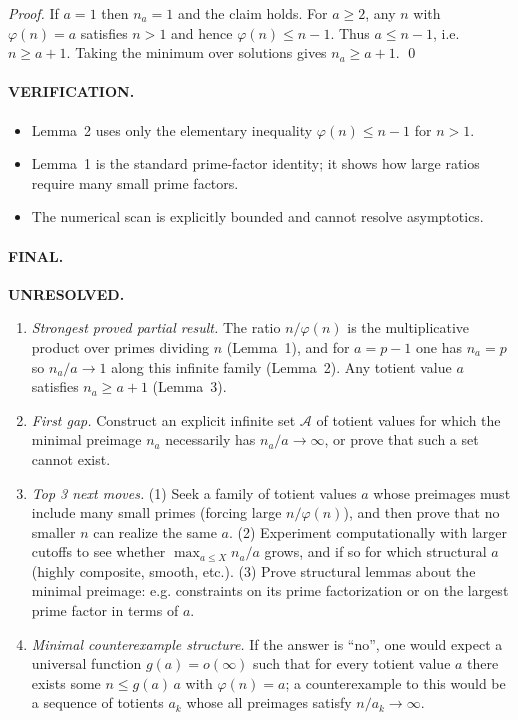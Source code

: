 \emph{Proof.}
If $a=1$ then $n_a=1$ and the claim holds.
For $a\ge 2$, any $n$ with $\varphi(n)=a$ satisfies $n>1$ and hence $\varphi(n)\le n-1$.
Thus $a\le n-1$, i.e. $n\ge a+1$.
Taking the minimum over solutions gives $n_a\ge a+1$. \qed

\paragraph{VERIFICATION.}
\begin{itemize}
\item Lemma~2 uses only the elementary inequality $\varphi(n)\le n-1$ for $n>1$.
\item Lemma~1 is the standard prime-factor identity; it shows how large ratios require many small prime factors.
\item The numerical scan is explicitly bounded and cannot resolve asymptotics.
\end{itemize}

\paragraph{FINAL.} \textbf{UNRESOLVED.}
\begin{enumerate}
\item[(i)] \emph{Strongest proved partial result.} The ratio $n/\varphi(n)$ is the multiplicative product over primes dividing $n$ (Lemma~1), and for $a=p-1$ one has $n_a=p$ so $n_a/a\to 1$ along this infinite family (Lemma~2). Any totient value $a$ satisfies $n_a\ge a+1$ (Lemma~3).
\item[(ii)] \emph{First gap.} Construct an explicit infinite set $\mathcal{A}$ of totient values for which the minimal preimage $n_a$ necessarily has $n_a/a\to\infty$, or prove that such a set cannot exist.
\item[(iii)] \emph{Top 3 next moves.}
(1) Seek a family of totient values $a$ whose preimages must include many small primes (forcing large $n/\varphi(n)$), and then prove that no smaller $n$ can realize the same $a$.
(2) Experiment computationally with larger cutoffs to see whether $\max_{a\le X} n_a/a$ grows, and if so for which structural $a$ (highly composite, smooth, etc.).
(3) Prove structural lemmas about the minimal preimage: e.g. constraints on its prime factorization or on the largest prime factor in terms of $a$.
\item[(iv)] \emph{Minimal counterexample structure.} If the answer is ``no'', one would expect a universal function $g(a)=o(\infty)$ such that for every totient value $a$ there exists some $n\le g(a)\,a$ with $\varphi(n)=a$; a counterexample to this would be a sequence of totients $a_k$ whose all preimages satisfy $n/a_k\to\infty$.
\end{enumerate}


